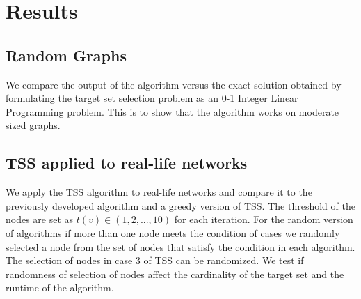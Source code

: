 \clearpage
\section{Results}
\subsection{Random Graphs}

We compare the output of the algorithm versus the exact solution obtained by formulating the target set selection problem as an 0-1 Integer Linear Programming problem. This is to show that the algorithm works on moderate sized graphs. 



\subsection{TSS applied to real-life networks}

We apply the TSS algorithm to real-life networks and compare it to the previously developed algorithm and a greedy version of TSS. The threshold of the nodes are set as $t(v)\in(1,2,...,10)$ for each iteration. For the random version of algorithms if more than one node meets the condition of cases we randomly selected a node from the set of nodes that satisfy the condition in each algorithm. The selection of nodes in case 3 of TSS can be randomized. We test if randomness of selection of nodes affect the cardinality of the target set and the runtime of the algorithm.

